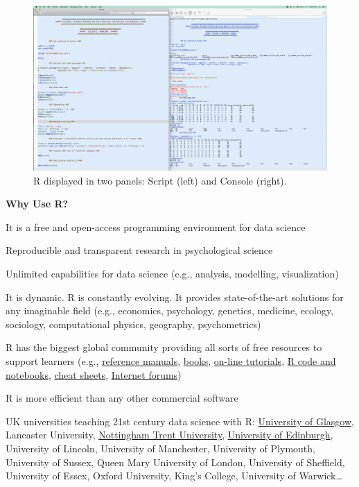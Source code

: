 \documentclass[
]{book}
\theoremstyle{definition}
\theoremstyle{definition}
\theoremstyle{definition}
\theoremstyle{definition}
\theoremstyle{remark}
\begin{document}
\begin{figure}

{\centering \includegraphics[width=1\linewidth]{./images/R_panels} 

}

\caption{R displayed in two panels: Script (left) and Console (right).}\label{fig:Rpanels}
\end{figure}

\textbf{Why Use R?}

It is a free and open-access programming environment for data science

Reproducible and transparent research in psychological science

Unlimited capabilities for data science (e.g., analysis, modelling, visualization)

It is dynamic. R is constantly evolving. It provides state-of-the-art solutions for any imaginable field (e.g., economics, psychology, genetics, medicine, ecology, sociology, computational physics, geography, psychometrics)

R has the biggest global community providing all sorts of free resources to support learners (e.g., \href{https://cran.r-project.org/doc/manuals/r-release/R-intro.html}{reference manuals}, \href{https://bookdown.org}{books}, \href{http://milton-the-cat.rocks/learnr/r/r_getting_started/\#section-installing-r-and-rstudio}{on-line tutorials}, \href{https://debruine.github.io/lmem_sim/}{R code and notebooks}, \href{https://github.com/rstudio/cheatsheets/blob/main/base-r.pdf}{cheat sheets}, \href{https://community.rstudio.com}{Internet forums})

R is more efficient than any other commercial software

UK universities teaching 21st century data science with R: \href{https://psyteachr.github.io}{University of Glasgow}, Lancaster University, \href{https://www.ntu.ac.uk/about-us/events/events/2022/6/teaching-statistics-with-r-in-psychology}{Nottingham Trent University}, \href{https://bookdown.org/animestina/dapr1_labs/}{University of Edinburgh}, University of Lincoln, University of Manchester, University of Plymouth, University of Sussex, Queen Mary University of London, University of Sheffield, University of Essex, Oxford University, King's College, University of Warwick\ldots{}
\end{document}
